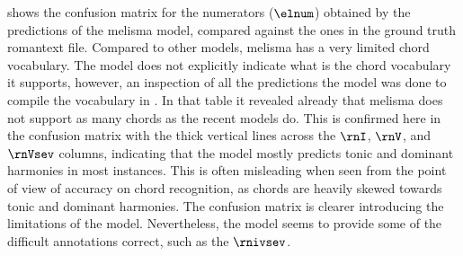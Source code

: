 

 shows the confusion matrix
for the numerators ($\elnum$) obtained by the predictions of
the \gls{melisma} model, compared against the ones in the
ground truth \gls{romantext} file. Compared to other models,
\gls{melisma} has a very limited chord vocabulary. The model
does not explicitly indicate what is the chord vocabulary it
supports, however, an inspection of all the predictions the
model was done to compile the vocabulary in
. In that table it revealed
already that \gls{melisma} does not support as many chords
as the recent models do. This is confirmed here in the
confusion matrix with the thick vertical lines across the
$\rnI$, $\rnV$, and $\rnVsev$ columns, indicating that the
model mostly predicts tonic and dominant harmonies in most
instances. This is often misleading when seen from the point
of view of accuracy on chord recognition, as chords are
heavily skewed towards tonic and dominant harmonies. The
confusion matrix is clearer introducing the limitations of
the model. Nevertheless, the model seems to provide some of
the difficult annotations correct, such as the $\rnivsev$.



